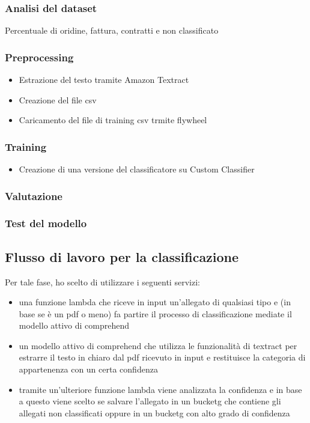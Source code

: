 \subsubsection{Analisi del dataset}
Percentuale di oridine, fattura, contratti e non classificato 
\subsubsection{Preprocessing}
\begin{itemize}
    \item Estrazione del testo tramite Amazon Textract 
    \item Creazione del file csv 
    \item Caricamento del file di training csv trmite flywheel 
\end{itemize}
\subsubsection{Training}
\begin{itemize}
    \item Creazione di una versione del classificatore su Custom Classifier 
\end{itemize}
\subsubsection{Valutazione}
\subsubsection{Test del modello}
\subsection{Flusso di lavoro per la classificazione}
\label{subsec:classificazione}
Per tale fase, ho scelto di utilizzare i seguenti servizi:
\begin{itemize}
    \item una funzione lambda che riceve in input un'allegato di qualsiasi tipo e (in base se è un pdf o meno) fa partire il processo di classificazione mediate il modello attivo di comprehend
    \item un modello attivo di comprehend che utilizza le funzionalità di textract per estrarre il testo in chiaro dal pdf ricevuto in input e restituisce la categoria di appartenenza con un certa confidenza
    \item tramite un'ulteriore funzione lambda viene analizzata la confidenza e in base a questo viene scelto se salvare l'allegato in un \gls{bucketg} che contiene gli allegati non classificati oppure in un \gls{bucketg} con alto grado di confidenza
\end{itemize}

